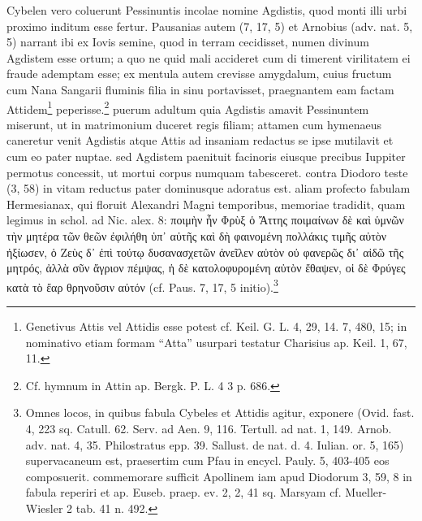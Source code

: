 \documentclass[a4paper, 11pt, oneside, polutonikogreek, german]{article}
\begin{document}
Cybelen vero coluerunt Pessinuntis incolae nomine Agdistis, quod monti illi urbi proximo inditum esse fertur. Pausanias autem (7, 17, 5) et Arnobius (adv. nat. 5, 5) narrant ibi ex Iovis semine, quod in terram cecidisset, numen divinum Agdistem esse ortum; a quo ne quid mali accideret cum di timerent virilitatem ei fraude ademptam esse; ex mentula autem crevisse amygdalum, cuius fructum cum Nana Sangarii fluminis filia in sinu portavisset, praegnantem eam factam Attidem\footnote{Genetivus Attis vel Attidis esse potest cf. Keil. G. L. 4, 29, 14. 7, 480, 15; in nominativo etiam formam "`Atta"' usurpari testatur Charisius ap. Keil. 1, 67, 11.} peperisse.\footnote{Cf. hymnum in Attin ap. Bergk. P. L. 4 3 p. 686.} puerum adultum quia Agdistis amavit Pessinuntem miserunt, ut in matrimonium duceret regis filiam; attamen cum hymenaeus caneretur venit Agdistis atque Attis ad insaniam redactus se ipse mutilavit et cum eo pater nuptae. sed Agdistem paenituit facinoris eiusque precibus Iuppiter permotus concessit, ut mortui corpus numquam tabesceret. contra Diodoro teste (3, 58) in vitam reductus pater dominusque adoratus est. aliam profecto fabulam Hermesianax, qui floruit Alexandri Magni temporibus, memoriae tradidit, quam legimus in schol. ad Nic. alex. 8: ποιμὴν ἦν Φρὺξ ὁ Ἄττης ποιμαίνων δὲ καὶ ὑμνῶν τὴν μητέρα τῶν θεῶν ἐφιλήθη ὑπ᾽ αὐτῆς καὶ δὴ φαινομένη πολλάκις τιμῆς αὐτὸν ἠξίωσεν, ὁ Ζεὺς δ᾽ ἐπὶ τούτῳ δυσανασχετῶν ἀνεῖλεν αὐτὸν οὐ φανερῶς δι᾽ αἰδῶ τῆς μητρός, ἀλλὰ σῦν ἄγριον πέμψας, ἡ δὲ κατολοφυρομένη αὐτὸν ἔθαψεν, οἱ δὲ Φρύγες κατὰ τὸ ἔαρ θρηνοῦσιν αὐτόν (cf. Paus. 7, 17, 5 initio).\footnote{Omnes locos, in quibus fabula Cybeles et Attidis agitur, exponere (Ovid. fast. 4, 223 sq. Catull. 62. Serv. ad Aen. 9, 116. Tertull. ad nat. 1, 149. Arnob. adv. nat. 4, 35. Philostratus epp. 39. Sallust. de nat. d. 4. Iulian. or. 5, 165) supervacaneum est, praesertim cum Pfau in encycl. Pauly. 5, 403-405 eos composuerit. commemorare sufficit Apollinem iam apud Diodorum 3, 59, 8 in fabula reperiri et ap. Euseb. praep. ev. 2, 2, 41 sq. Marsyam cf. Mueller-Wiesler 2 tab. 41 n. 492.}
\end{document}
